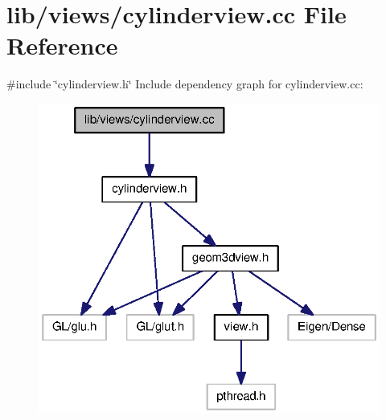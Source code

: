\section{lib/views/cylinderview.cc \-File \-Reference}
\label{cylinderview_8cc}
{\ttfamily \#include \char`\"{}cylinderview.\-h\char`\"{}}\*
\-Include dependency graph for cylinderview.\-cc\-:
\nopagebreak
\begin{figure}[H]
\begin{center}
\leavevmode
\includegraphics[width=322pt]{cylinderview_8cc__incl}
\end{center}
\end{figure}
